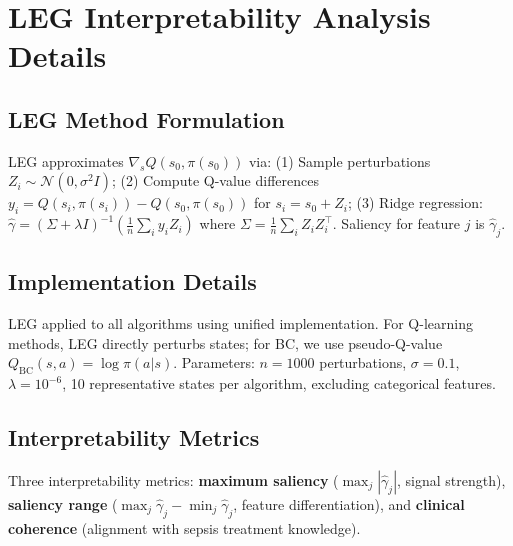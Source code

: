 
\appendix

\section{LEG Interpretability Analysis Details}\label{appendix:leg}

\subsection{LEG Method Formulation}

LEG approximates $\nabla_s Q(s_0, \pi(s_0))$ via: (1) Sample perturbations $Z_i \sim \mathcal{N}(0, \sigma^2 I)$; (2) Compute Q-value differences $y_i = Q(s_i, \pi(s_i)) - Q(s_0, \pi(s_0))$ for $s_i = s_0 + Z_i$; (3) Ridge regression: $\hat{\gamma} = (\Sigma + \lambda I)^{-1}(\frac{1}{n} \sum_i y_i Z_i)$ where $\Sigma = \frac{1}{n} \sum_i Z_i Z_i^\top$. Saliency for feature $j$ is $\hat{\gamma}_j$.

\subsection{Implementation Details}

LEG applied to all algorithms using unified implementation. For Q-learning methods, LEG directly perturbs states; for BC, we use pseudo-Q-value $Q_{\text{BC}}(s, a) = \log \pi(a|s)$. Parameters: $n=1000$ perturbations, $\sigma=0.1$, $\lambda=10^{-6}$, 10 representative states per algorithm, excluding categorical features.

\subsection{Interpretability Metrics}

Three interpretability metrics: \textbf{maximum saliency} ($\max_j |\hat{\gamma}_j|$, signal strength), \textbf{saliency range} ($\max_j \hat{\gamma}_j - \min_j \hat{\gamma}_j$, feature differentiation), and \textbf{clinical coherence} (alignment with sepsis treatment knowledge).
